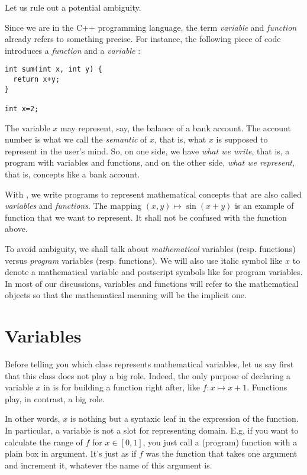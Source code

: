 Let us rule out a potential ambiguity.

Since we are in the C++ programming language, the term {\it variable} and
{\it function} already refers to something precise. For instance, the following
piece of code introduces a {\it function}  and a {\it variable} :
\begin{lstlisting}
int sum(int x, int y) { 
  return x+y;
}

int x=2;
\end{lstlisting}
The variable $x$ may represent, say, the balance of a bank account.
The account number is what we call the {\it semantic} of $x$, that is, what $x$ is supposed
to represent in the user's mind. So, on one side,
we have {\it what we write}, that is, a program with variables and functions,
 and on the other side, {\it what we represent}, that is, concepts 
like a bank account.

With \ibex, we write programs to represent mathematical concepts
that are also called {\it variables} and {\it functions}.
The mapping $(x,y)\mapsto \sin(x+y)$ is an example of function that
we want to represent. It shall not be confused with the function 
above.

To avoid ambiguity, we shall talk about {\it mathematical}
variables (resp. functions) versus {\it program} variables (resp. functions).
We will also use italic symbol like $x$ to denote a mathematical variable
and postscript symbols like  for program variables.
In most of our discussions, variables and functions will refer
to the mathematical objects so that the mathematical meaning will be the implicit one. 

\section{Variables}

Before telling you which class represents mathematical variables, let us say first that
this class does not play a big role.
Indeed, the only purpose of declaring a variable $x$ in \ibex is
for building a function right after, like $f:x\mapsto x+1$.
Functions play, in contrast, a big role.

In other words, $x$ is nothing but a syntaxic leaf in the expression 
of the function. In particular, a variable is not a slot for
representing domain. %
E.g, if you want to calculate the range of $f$ for $x\in [0,1]$,
you just call a (program) function  with a plain box in argument.
It's just as if $f$ was the function that takes one argument and
increment it, whatever the name of this argument is.

